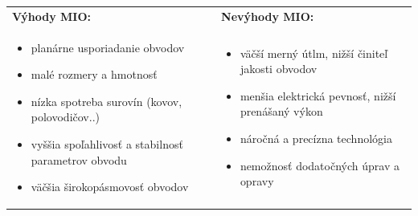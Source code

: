 \begin{tabular}{p{8cm} p{8cm}}
	
	\textbf{Výhody MIO:} & \textbf{Nevýhody MIO:} \\

	\begin{minipage}[t]{8cm}
		\begin{itemize}[label=$\oplus$]
			\item planárne usporiadanie obvodov
			\item malé rozmery a hmotnosť
			\item nízka spotreba surovín (kovov, polovodičov..)
			\item vyššia spoľahlivosť a stabilnosť parametrov obvodu
			\item väčšia širokopásmovosť obvodov
		\end{itemize}
	\end{minipage}
	&
	\begin{minipage}[t]{8cm}
		\begin{itemize}[label=$\ominus$]
			\item väčší merný útlm, nižší činiteľ jakosti obvodov
			\item menšia elektrická pevnosť, nižší prenášaný výkon
			\item náročná a precízna technológia
			\item nemožnosť dodatočných úprav a opravy
		\end{itemize}
	\end{minipage}
\end{tabular}

